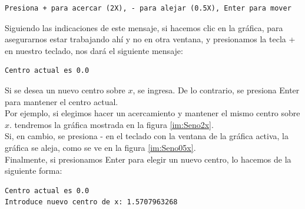 \documentclass[10pt]{article}
\begin{document}
\begin{verbatim}
Presiona + para acercar (2X), - para alejar (0.5X), Enter para mover
\end{verbatim}

\noindent Siguiendo las indicaciones de este mensaje, si hacemos clic en la gráfica, para asegurarnos estar trabajando ahí y no en otra ventana, y presionamos la tecla + en nuestro teclado, nos dará el siguiente mensaje:

\begin{verbatim}
Centro actual es 0.0
\end{verbatim}

\noindent Si se desea un nuevo centro sobre $x$, se ingresa. De lo contrario, se presiona Enter para mantener el centro actual.\\
Por ejemplo, si elegimos hacer un acercamiento y mantener el mismo centro sobre $x$. tendremos la gráfica mostrada en la figura \ref{im:Seno2x}.\\
Si, en cambio, se presiona - en el teclado con la ventana de la gráfica activa, la gráfica se aleja, como se ve en la figura \ref{im:Seno05x}.\\
Finalmente, si presionamos Enter para elegir un nuevo centro, lo hacemos de la siguiente forma:

\begin{verbatim}
Centro actual es 0.0
Introduce nuevo centro de x: 1.5707963268
\end{verbatim}
\end{document}
